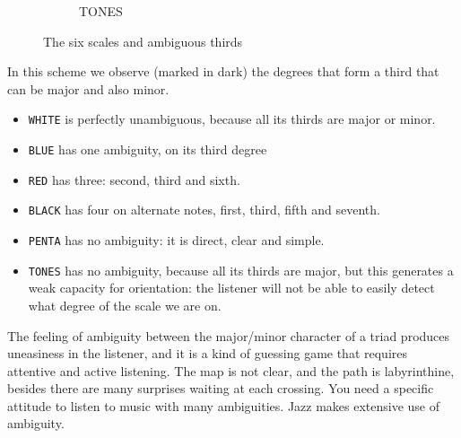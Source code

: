 \documentclass[]{report}
\providecommand{\tightlist}{%
\setlength{\itemsep}{0pt}
\setlength{\parskip}{0pt}
}
\begin{document}
\begin{figure}
\begin{subfigure}{0.15\textwidth}
\end{subfigure}
\hfill
\begin{subfigure}{0.15\textwidth}
\centering
{}    
\caption{\textsf{TONES}}

\end{subfigure}
\hfill
\caption{The six scales and ambiguous thirds}\label{fig:the-six-scales-and-ambiguous-thirds}
\end{figure}
In this scheme we observe (marked in dark) the degrees that form a third that can be major and also minor.
\begin{itemize} \tightlist
\item \texttt{WHITE} is perfectly unambiguous, because all its thirds are major or minor.
\item \texttt{BLUE} has one ambiguity, on its third degree
\item \texttt{RED} has three: second, third and sixth.
\item \texttt{BLACK} has four on alternate notes, first, third, fifth and seventh.
\item \texttt{PENTA} has no ambiguity: it is direct, clear and simple.
\item \texttt{TONES} has no ambiguity, because all its thirds are major, but this generates a weak capacity for orientation: the listener will not be able to easily detect what degree of the scale we are on.
\end{itemize}
The feeling of ambiguity between the major/minor character of a triad produces uneasiness in the listener, and it is a kind of guessing game that requires attentive and active listening. The map is not clear, and the path is labyrinthine, besides there are many surprises waiting at each crossing. You need a specific attitude to listen to music with many ambiguities. Jazz makes extensive use of ambiguity.
\end{document}
